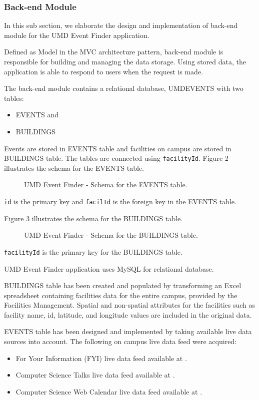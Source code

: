 \documentclass{acm_proc_article-sp}
\begin{document}
\subsubsection{Back-end Module}
In this sub section, we elaborate the design and implementation of back-end module for the UMD Event Finder application. 

Defined as Model in the MVC architecture pattern, back-end module is responsible for building and managing the data storage. Using stored data, the application is able to respond to users when the request is made. 

The back-end module contains a relational database, UMDEVENTS with two tables:
\begin{itemize}
\item EVENTS and
\item BUILDINGS 
\end{itemize}

Events are stored in EVENTS table and facilities on campus are stored in BUILDINGS table. The tables are connected using \texttt{facilityId}. Figure 2 illustrates the schema for the EVENTS table. 

\begin{figure*}
\centering
{}
\caption{UMD Event Finder - Schema for the EVENTS table.}
\end{figure*}

\texttt{id} is the primary key and \texttt{facilId} is the foreign key in the EVENTS table. 

Figure 3 illustrates the schema for the BUILDINGS table. 

\begin{figure*}
\centering
{}
\caption{UMD Event Finder - Schema for the BUILDINGS table.}
\end{figure*}

\texttt{facilityId} is the primary key for the BUILDINGS table. 

UMD Event Finder application uses MySQL for relational database. 

BUILDINGS table has been created and populated by transforming an Excel spreadsheet containing facilities data for the entire campus, provided by the Facilities Management. Spatial and non-spatial attributes for the facilities such as facility name, id, latitude, and longitude values are included in the original data.

EVENTS table has been designed and implemented by taking available live data sources into account. The following on campus live data feed were acquired:
\begin{itemize}
\item For Your Information (FYI) live data feed available at \cite{fyi:xmlfeed}.
\item Computer Science Talks live data feed available at \cite{cs:talks}.
\item Computer Science Web Calendar live data feed available at \cite{cs:webcal}.
\end{itemize}
\end{document}
